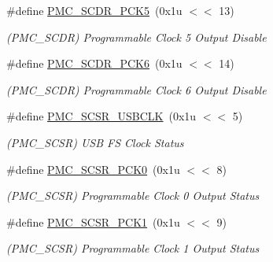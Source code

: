 \begin{DoxyCompactItemize}
\mbox{\label{group__SAME70__PMC_ga1cdd79cbb68533f00c18036bf00ce4d8}} 
\#define \mbox{\hyperlink{group__SAME70__PMC_ga1cdd79cbb68533f00c18036bf00ce4d8}{P\+M\+C\+\_\+\+S\+C\+D\+R\+\_\+\+P\+C\+K5}}~(0x1u $<$$<$ 13)
\begin{DoxyCompactList}\small\item\em (P\+M\+C\+\_\+\+S\+C\+DR) Programmable Clock 5 Output Disable \end{DoxyCompactList}\item 
\mbox{\label{group__SAME70__PMC_gab2a6789dc5f4f2ad0e70ba03e4a1afea}} 
\#define \mbox{\hyperlink{group__SAME70__PMC_gab2a6789dc5f4f2ad0e70ba03e4a1afea}{P\+M\+C\+\_\+\+S\+C\+D\+R\+\_\+\+P\+C\+K6}}~(0x1u $<$$<$ 14)
\begin{DoxyCompactList}\small\item\em (P\+M\+C\+\_\+\+S\+C\+DR) Programmable Clock 6 Output Disable \end{DoxyCompactList}\item 
\mbox{\label{group__SAME70__PMC_gaae4649949446a4c6141a337bc45b1c30}} 
\#define \mbox{\hyperlink{group__SAME70__PMC_gaae4649949446a4c6141a337bc45b1c30}{P\+M\+C\+\_\+\+S\+C\+S\+R\+\_\+\+U\+S\+B\+C\+LK}}~(0x1u $<$$<$ 5)
\begin{DoxyCompactList}\small\item\em (P\+M\+C\+\_\+\+S\+C\+SR) U\+SB FS Clock Status \end{DoxyCompactList}\item 
\mbox{\label{group__SAME70__PMC_ga6eabb3e97d15e03c3d972905170d971c}} 
\#define \mbox{\hyperlink{group__SAME70__PMC_ga6eabb3e97d15e03c3d972905170d971c}{P\+M\+C\+\_\+\+S\+C\+S\+R\+\_\+\+P\+C\+K0}}~(0x1u $<$$<$ 8)
\begin{DoxyCompactList}\small\item\em (P\+M\+C\+\_\+\+S\+C\+SR) Programmable Clock 0 Output Status \end{DoxyCompactList}\item 
\mbox{\label{group__SAME70__PMC_gaeb9d3d3ebc60d5e7c5770b2ff71c6279}} 
\#define \mbox{\hyperlink{group__SAME70__PMC_gaeb9d3d3ebc60d5e7c5770b2ff71c6279}{P\+M\+C\+\_\+\+S\+C\+S\+R\+\_\+\+P\+C\+K1}}~(0x1u $<$$<$ 9)
\begin{DoxyCompactList}\small\item\em (P\+M\+C\+\_\+\+S\+C\+SR) Programmable Clock 1 Output Status \end{DoxyCompactList}\item 
$$
\end{DoxyCompactItemize}
